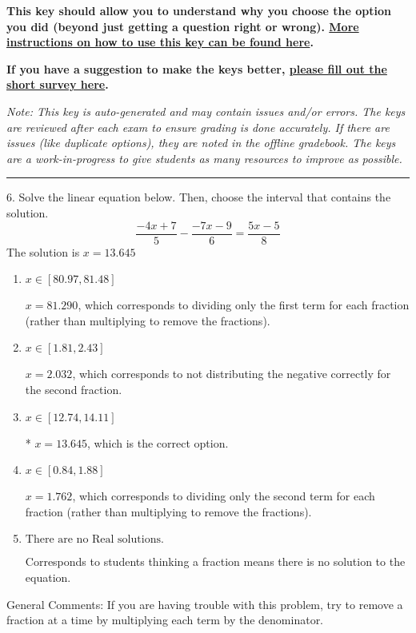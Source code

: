 \documentclass{article}[14pt]
\begin{document}
\textbf{This key should allow you to understand why you choose the option you did (beyond just getting a question right or wrong). \href{https://xronos.clas.ufl.edu/mac1105spring2020/courseDescriptionAndMisc/Exams/LearningFromResults}{More instructions on how to use this key can be found here}.}

\textbf{If you have a suggestion to make the keys better, \href{https://forms.gle/CZkbZmPbC9XALEE88}{please fill out the short survey here}.}

\textit{Note: This key is auto-generated and may contain issues and/or errors. The keys are reviewed after each exam to ensure grading is done accurately. If there are issues (like duplicate options), they are noted in the offline gradebook. The keys are a work-in-progress to give students as many resources to improve as possible.}

\rule{\textwidth}{0.4pt}

6. Solve the linear equation below. Then, choose the interval that contains the solution.
$$ \frac{-4 x + 7}{5} - \frac{-7 x - 9}{6} = \frac{5 x - 5}{8} $$ 
The solution is $ x = 13.645 $ 

\begin{enumerate}[label=\Alph*.] 
\item $ x \in [80.97, 81.48] $ 

  $x = 81.290$, which corresponds to dividing only the first term for each fraction (rather than multiplying to remove the fractions). 
\item $ x \in [1.81, 2.43] $ 

  $x = 2.032$, which corresponds to not distributing the negative correctly for the second fraction. 
\item $ x \in [12.74, 14.11] $ 

 * $x = 13.645$, which is the correct option. 
\item $ x \in [0.84, 1.88] $ 

  $x = 1.762$, which corresponds to dividing only the second term for each fraction (rather than multiplying to remove the fractions). 
\item $ \text{There are no Real solutions.} $ 

 Corresponds to students thinking a fraction means there is no solution to the equation. 
\end{enumerate} 
 
General Comments: If you are having trouble with this problem, try to remove a fraction at a time by multiplying each term by the denominator.
\end{document}
